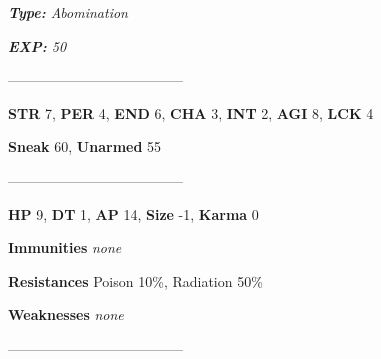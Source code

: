 \documentclass[11pt,a4paper,twocolumn]{book}
\begin{document}
	\noindent
	\emph{\textbf{Type:} Abomination}
	
	\noindent
	\emph{\textbf{EXP:} 50}
	
%		
%	
%		

	--------------------------------------
	
	\noindent
	\textbf{STR} 7, \textbf{PER} 4, \textbf{END} 6, \textbf{CHA} 3, \textbf{INT} 2, \textbf{AGI} 8, \textbf{LCK} 4
	
	\noindent
	\textbf{Sneak} 60, \textbf{Unarmed} 55
	
	--------------------------------------
	
	\noindent
	\textbf{HP} 9, \textbf{DT} 1, \textbf{AP} 14, \textbf{Size} -1, \textbf{Karma} 0
	
	
	\noindent
	\textbf{Immunities} \emph{none}
	
	\noindent
	\textbf{Resistances} Poison 10\%, Radiation 50\%
	
	\noindent
	\textbf{Weaknesses} \emph{none} %
	
	--------------------------------------
	
\end{document}
